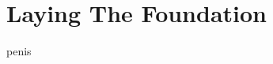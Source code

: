 
\begin{comment}
  what to do what to do what to do.
  In this section should talk about what we did for our infrastructure, what decisions we made, what we thought we would need to factor in later on.
  
things to talk about:
  - why infrastructure is soo important
    - it is the skelenton of the program
    - once infrastructure is in place, it defines what is easy to change, and what can't change without major refactor
  - what we define as infrastructure
    - networking
    - gameploop
    - how the server and client synchronize
    - graphics
\end{comment}
    
\section{Laying The Foundation}
 
penis